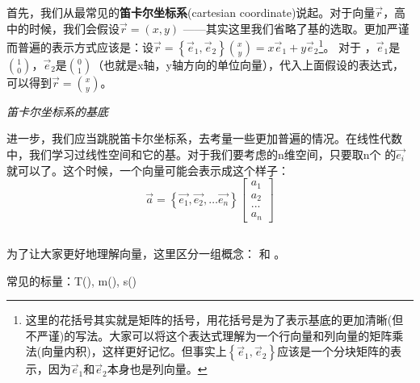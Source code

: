 首先，我们从最常见的\textbf{笛卡尔坐标系}(cartesian coordinate)说起。对于向量$\vec{r}$，高中的时候，我们会假设$\vec{r}=(x,y)$ ——其实这里我们省略了基的选取。更加严谨而普遍的表示方式应该是：设$\displaystyle\vec{r} =\left \{ \vec{e }_{1} ,\vec{e }_{2}  \right \} \binom{x}{y} =x\vec{e }_{1}+y\vec{e }_{2}$\footnote{这里的花括号其实就是矩阵的括号，用花括号是为了表示基底的更加清晰(但不严谨)的写法。大家可以将这个表达式理解为一个行向量和列向量的矩阵乘法(向量内积)，这样更好记忆。但事实上$\left \{ \vec{e }_{1} ,\vec{e }_{2}  \right \}$应该是一个分块矩阵的表示，因为$\vec{e }_{1}$和$\vec{e }_{2}$本身也是列向量。}。
对于 ，$\vec{e }_{1}$是$\displaystyle\binom{1}{0} $，$\displaystyle
\vec{e }_{2}$是$\displaystyle\binom{0}{1} $（也就是x轴，y轴方向的单位向量），代入上面假设的表达式，可以得到$\displaystyle\vec{r}=\binom{x}{y}  $。
\begin{center}

	\em 笛卡尔坐标系的基底

\end{center}

进一步，我们应当跳脱笛卡尔坐标系，去考量一些更加普遍的情况。在线性代数中，我们学习过线性空间和它的基。对于我们要考虑的n维空间，只要取n个\linebreak{} 的$\vec{e_{i} }$就可以了。这个时候，一个向量可能会表示成这个样子：
\[\vec{a} =\left \{ \vec{e_{1} } ,\vec{e_{2} } ,\ldots\vec{e_{n} }\right \} 
\begin{bmatrix}
  a_{1} \\
  a_{2} \\
  ...\\
  a_{n}
\end{bmatrix}\]

\subsection[向量与标量]{}
为了让大家更好地理解向量，这里区分一组概念： 和 。
\begin{Itemize}
	\item {} 
\end{Itemize}
常见的标量：T(), m(), s()
